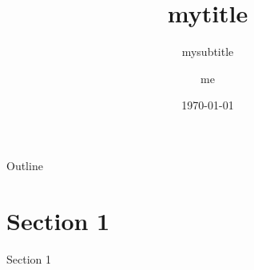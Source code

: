 \documentclass[aspectratio=169]{beamer}
\title{mytitle}
\subtitle{mysubtitle}
\author{me}
\date{\today}
\begin{document}
\begin{frame}
    \titlepage
\end{frame}


\begin{frame}{Outline}
    \begin{multicols}{2}
        \tableofcontents[subsubsectionstyle=hide]
    \end{multicols}
\end{frame}



\section{Section 1}
\begin{frame}{Section 1}
    \lipsum[1]
\end{frame}
\end{document}
